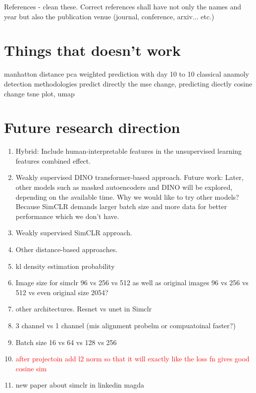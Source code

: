 References - clean these. Correct references shall have not only the names and year but also the publication venue (journal, conference, arxiv... etc.)

\section{Things that doesn't work}
manhatton distance 
pca weighted 
prediction with day 10 to 10 classical anamoly detection methodologies
predict directly the mse change, predicting diectly cosine change
tsne plot, umap

\section{Future research direction}

\begin{enumerate}
    \item Hybrid: Include human-interpretable features in the unsupervised learning features combined effect.
    \item Weakly supervised DINO transformer-based approach. Future work: Later, other models such as masked autoencoders and DINO will be explored, depending on the available time.
	Why we would like to try other models? Because SimCLR demands larger batch size and more data for better performance which we don't have.
    \item Weakly supervised SimCLR approach.
    \item Other distance-based approaches.
    \item kl density estimation probability
    \item Image size for simclr 96 vs 256 vs 512 as well as original images 96 vs 256 vs 512 vs even original size 2054?
    \item other architectures. Resnet vs unet in Simclr
    \item 3 channel vs 1 channel (mis alignment probelm or compuatoinal faster?)
    \item Batch size 16 vs 64 vs 128 vs 256
    \item \textcolor{red}{after projectoin add l2 norm so that it will exactly like the loss fn gives good cosine sim} 
    \item new paper about simclr in linkedin magda

\end{enumerate}
